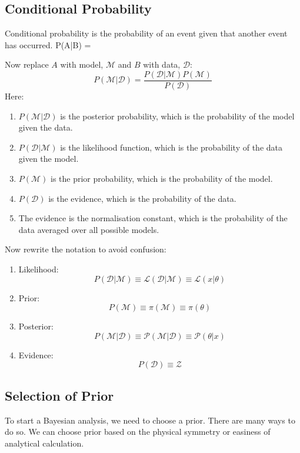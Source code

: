 \documentclass[12pt,a4paper]{article}
\begin{document}
\subsection{Conditional Probability}
\begin{definition}
    {Conditional probability is the probability of an event given that another event has occurred.}
    {P(A|B) = }
    {}
\end{definition}
Now replace $A$ with model, $\mathcal{M}$ and $B$ with data, $\mathcal{D}$:
$$
    P(\mathcal{M}|\mathcal{D}) = \frac{P(\mathcal{D}|\mathcal{M})P(\mathcal{M})}{P(\mathcal{D})}
$$
Here:
\begin{enumerate}
    \item $P(\mathcal{M}|\mathcal{D})$ is the posterior probability, which is the probability of the model given the data.
    \item $P(\mathcal{D}|\mathcal{M})$ is the likelihood function, which is the probability of the data given the model.
    \item $P(\mathcal{M})$ is the prior probability, which is the probability of the model.
    \item $P(\mathcal{D})$ is the evidence, which is the probability of the data.
    \item The evidence is the normalisation constant, which is the probability of the data averaged over all possible models.
\end{enumerate}
Now rewrite the notation to avoid confusion:\\
\begin{enumerate}
    \item Likelihood:
    $$
        P(\mathcal{D}|\mathcal{M}) \equiv \mathcal{L}(\mathcal{D}|\mathcal{M}) \equiv \mathcal{L}(x|\theta)
    $$
    \item Prior:
    $$
        P(\mathcal{M}) \equiv \pi(\mathcal{M}) \equiv \pi(\theta)
    $$
    \item Posterior:
    $$
        P(\mathcal{M}|\mathcal{D}) \equiv \mathcal{P}(\mathcal{M}|\mathcal{D}) \equiv \mathcal{P}(\theta|x)
    $$
    \item Evidence:
    $$
        P(\mathcal{D}) \equiv \mathcal{Z}
    $$
\end{enumerate}
\subsection{Selection of Prior}
To start a Bayesian analysis, we need to choose a prior. There are many ways to do so. We can choose prior based on the physical symmetry or easiness of analytical calculation.\\
\end{document}
